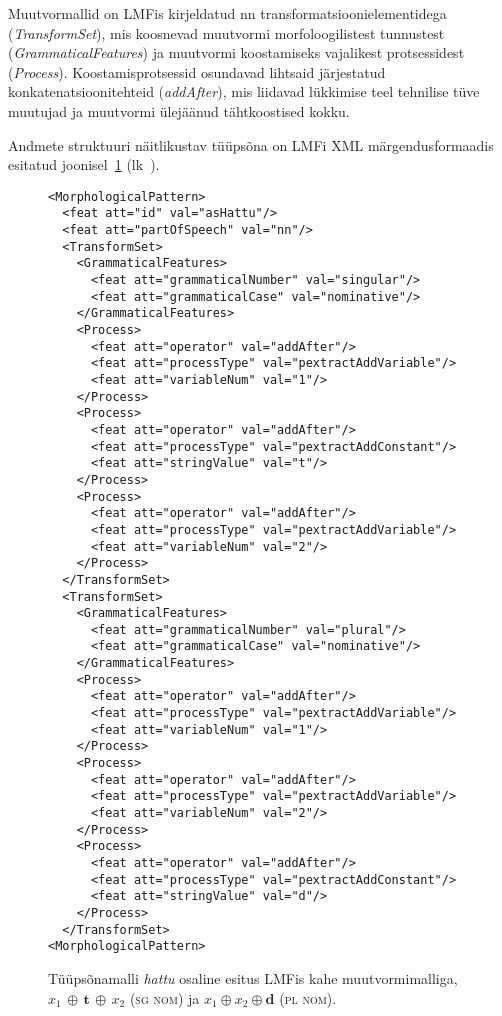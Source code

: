 \documentclass[12pt,a4paper]{article}
\newcommand{\vadja}[1]{\textit{#1}}
\newcommand{\msd}[1]{\textsc{#1}}
\begin{document}
Muutvormallid on LMFis kirjeldatud nn transformatsiooni\-elementidega (\textit{TransformSet}), mis koosnevad muutvormi morfoloogilistest tunnustest (\textit{GrammaticalFeatures}) ja muutvormi koostamiseks vajalikest protsessidest (\textit{Process}). Koostamis\-protsessid osundavad lihtsaid järjestatud konkatenatsiooni\-tehteid (\textit{addAfter}), mis liidavad lükkimise teel tehnilise tüve muutujad ja muutvormi ülejäänud tähtkoostised kokku.

Andmete struktuuri näitlikustav tüüpsõna on LMFi XML märgendus\-formaadis esitatud joonisel~\ref{code:lmf-paradigmpattern} (lk~\pageref{code:lmf-paradigmpattern}).

\begin{figure}[h]
  \center
\begin{verbatim}
<MorphologicalPattern>
  <feat att="id" val="asHattu"/>
  <feat att="partOfSpeech" val="nn"/>
  <TransformSet>
    <GrammaticalFeatures>
      <feat att="grammaticalNumber" val="singular"/>
      <feat att="grammaticalCase" val="nominative"/>
    </GrammaticalFeatures>
    <Process>
      <feat att="operator" val="addAfter"/>
      <feat att="processType" val="pextractAddVariable"/>
      <feat att="variableNum" val="1"/>
    </Process>
    <Process>
      <feat att="operator" val="addAfter"/>
      <feat att="processType" val="pextractAddConstant"/>
      <feat att="stringValue" val="t"/>
    </Process>
    <Process>
      <feat att="operator" val="addAfter"/>
      <feat att="processType" val="pextractAddVariable"/>
      <feat att="variableNum" val="2"/>
    </Process>
  </TransformSet>
  <TransformSet>
    <GrammaticalFeatures>
      <feat att="grammaticalNumber" val="plural"/>
      <feat att="grammaticalCase" val="nominative"/>
    </GrammaticalFeatures>
    <Process>
      <feat att="operator" val="addAfter"/>
      <feat att="processType" val="pextractAddVariable"/>
      <feat att="variableNum" val="1"/>
    </Process>
    <Process>
      <feat att="operator" val="addAfter"/>
      <feat att="processType" val="pextractAddVariable"/>
      <feat att="variableNum" val="2"/>
    </Process>
    <Process>
      <feat att="operator" val="addAfter"/>
      <feat att="processType" val="pextractAddConstant"/>
      <feat att="stringValue" val="d"/>
    </Process>
  </TransformSet>
<MorphologicalPattern>
\end{verbatim}
\caption{Tüüpsõnamalli \vadja{hattu} osaline esitus LMF\-is kahe muutvormimalliga, $x_1\,\oplus\,\textbf{t}\,\oplus\,x_2$ (\msd{sg nom}) ja $x_1 \oplus x_2 \oplus \textbf{d}$ (\msd{pl nom}).
  \label{code:lmf-paradigmpattern}}
\end{figure}
\end{document}
